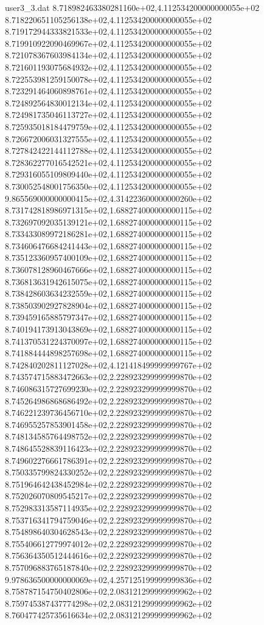 \begin{filecontents}{user3_3.dat}
8.718982463380281160e+02,4.112534200000000055e+02
8.718220651105256138e+02,4.112534200000000055e+02
8.719172944333821533e+02,4.112534200000000055e+02
8.719910922090469967e+02,4.112534200000000055e+02
8.721078367603984134e+02,4.112534200000000055e+02
8.721601193075684932e+02,4.112534200000000055e+02
8.722553981259150078e+02,4.112534200000000055e+02
8.723291464060898761e+02,4.112534200000000055e+02
8.724892564830012134e+02,4.112534200000000055e+02
8.724981735046113727e+02,4.112534200000000055e+02
8.725935018184479759e+02,4.112534200000000055e+02
8.726672006031327555e+02,4.112534200000000055e+02
8.727842422144112788e+02,4.112534200000000055e+02
8.728362277016542521e+02,4.112534200000000055e+02
8.729316055109809440e+02,4.112534200000000055e+02
8.730052548001756350e+02,4.112534200000000055e+02
9.865569000000000415e+02,4.314223600000000260e+02
8.731742818986971315e+02,1.688274000000000115e+02
8.732697092035139121e+02,1.688274000000000115e+02
8.733433089972186281e+02,1.688274000000000115e+02
8.734606476684241443e+02,1.688274000000000115e+02
8.735123360957400109e+02,1.688274000000000115e+02
8.736078128960467666e+02,1.688274000000000115e+02
8.736813631942615075e+02,1.688274000000000115e+02
8.738428603634232559e+02,1.688274000000000115e+02
8.738503902927828904e+02,1.688274000000000115e+02
8.739459165885797347e+02,1.688274000000000115e+02
8.740194173913043869e+02,1.688274000000000115e+02
8.741370531224370097e+02,1.688274000000000115e+02
8.741884444898257698e+02,1.688274000000000115e+02
8.742840202811127028e+02,4.121418499999999767e+02
8.743574715883472663e+02,2.228923299999999870e+02
8.746086315727699230e+02,2.228923299999999870e+02
8.745264986868686492e+02,2.228923299999999870e+02
8.746221239736456710e+02,2.228923299999999870e+02
8.746955257853901458e+02,2.228923299999999870e+02
8.748134585764498752e+02,2.228923299999999870e+02
8.748645528839116423e+02,2.228923299999999870e+02
8.749602276661786391e+02,2.228923299999999870e+02
8.750335799824330252e+02,2.228923299999999870e+02
8.751964642438452984e+02,2.228923299999999870e+02
8.752026070809545217e+02,2.228923299999999870e+02
8.752983313587114935e+02,2.228923299999999870e+02
8.753716341794759046e+02,2.228923299999999870e+02
8.754898640304628543e+02,2.228923299999999870e+02
8.755406612779974012e+02,2.228923299999999870e+02
8.756364350512444616e+02,2.228923299999999870e+02
8.757096883765187840e+02,2.228923299999999870e+02
9.978636500000000069e+02,4.257125199999999836e+02
8.758787154750402806e+02,2.083121299999999962e+02
8.759745387437774298e+02,2.083121299999999962e+02
8.760477425735616634e+02,2.083121299999999962e+02

\end{filecontents}
